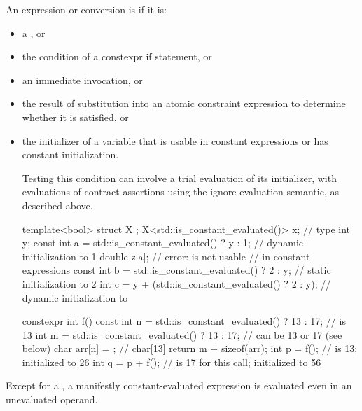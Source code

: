 \pnum
An expression or conversion is 
if it is:
\begin{itemize}
\item a , or
\item the condition of a constexpr if statement, or
\item an immediate invocation, or
\item the result of substitution into an atomic constraint expression
to determine whether it is satisfied, or
\item the initializer of a variable
that is usable in constant expressions or
has constant initialization.
\begin{footnote}
Testing this condition
can involve a trial evaluation of its initializer,
with evaluations of contract assertions
using the ignore evaluation semantic,
as described above.
\end{footnote}
\begin{example}
\begin{codeblock}
template<bool> struct X {};
X<std::is_constant_evaluated()> x;                      // type 
int y;
const int a = std::is_constant_evaluated() ? y : 1;     // dynamic initialization to 1
double z[a];                                            // error:  is not usable
                                                        // in constant expressions
const int b = std::is_constant_evaluated() ? 2 : y;     // static initialization to 2
int c = y + (std::is_constant_evaluated() ? 2 : y);     // dynamic initialization to 

constexpr int f() {
  const int n = std::is_constant_evaluated() ? 13 : 17; //  is 13
  int m = std::is_constant_evaluated() ? 13 : 17;       //  can be 13 or 17 (see below)
  char arr[n] = {}; // char[13]
  return m + sizeof(arr);
}
int p = f();                                            //  is 13; initialized to 26
int q = p + f();                                        //  is 17 for this call; initialized to 56
\end{codeblock}
\end{example}
\end{itemize}
\begin{note}
Except for a ,
a manifestly constant-evaluated expression
is evaluated even in an unevaluated operand.
\end{note}

